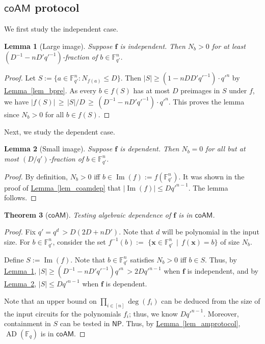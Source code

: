 \documentclass[11pt]{article}
\numberwithin{equation}{section}
\newtheorem{theorem}{Theorem}[section]
\newtheorem{lemma}[theorem]{Lemma}
\theoremstyle{definition}
\theoremstyle{plain}
\newcommand{\cclass}[1]{\textsf{#1}}
\newcommand{\expref}[2]{\hyperref[#2]{#1~\ref{#2}}}
\newcommand{\F}{\mathbb{F}}
\DeclareMathOperator{\im}{\mathrm{Im}}
\newcommand{\NP}{\cclass{NP}\xspace}  %
\newcommand{\coAM}{\cclass{coAM}\xspace}  %
\DeclareMathOperator{\AD}{\mathrm{AD}\xspace} %
\begin{document}
\subsection{\texorpdfstring{$\coAM$}{coAM} protocol}
We first study the independent case.
%

\begin{lemma}[Large image]\label{lem-coam-1}
Suppose $\mathbf f$
%
is  %
independent.
Then $N_b>0$ for at least $(D^{-1} - nD'q'^{-1})$-fraction of $b\in \F_{q'}^n$.
\end{lemma}
\begin{proof}
Let $S:= \{a\in \F_{q'}^n: N_{f(a)}\leq D\}$.
Then $|S|\geq (1-n DD'q'^{-1})\cdot q'^{n}$ by \expref{Lemma}{lem_bpre}.
As every $b\in f(S)$ has at most $D$ preimages in $S$ under $f$, we have 
$|f(S)| \,\ge\, |S|/D \,\ge\, (D^{-1}-nD'q'^{-1})\cdot q'^{n} $.
This proves the lemma since $N_b>0$ for all $b\in f(S)$.
\end{proof}

Next, we study the dependent case.

\begin{lemma}[Small image]\label{lem-coam-2}
Suppose $\mathbf f$
%
is  %
dependent.
Then $N_b=0$ for all but at most $(D/q')$-fraction of $b\in \F_{q'}^n$.
\end{lemma}
\begin{proof}
%
By definition, %
$N_b>0$ iff $b\in \im(f):=f(\F_{q'}^n)$. It was shown in the proof of \expref{Lemma}{lem_coamdep} that $|\im(f)| \le Dq'^{n-1}$. The lemma follows.
\end{proof}

\begin{theorem}[$\coAM$]\label{thm_coam}
Testing algebraic dependence of $\mathbf f$ is in $\coAM$.
\end{theorem}
\begin{proof}
Fix $q'=q^d \,> D(2D+nD')$. Note that $d$ will be polynomial in the input size.
For $b\in \F_{q'}^n$, consider the set 
$f^{-1}(b) :=$ $\{\mathbf x \in \F_{q'}^n \,\mid\, f(\mathbf x) = b \}$ of size $N_b$.

Define $S:= \im(f)$. Note that %
$b\in \F_{q'}^n$
%
satisfies   %
$N_b>0$ iff $b\in S$.
%
%
%
Thus, by \expref{Lemma}{lem-coam-1},
$|S|\ge (D^{-1} - nD'q'^{-1})q'^n\,> 2Dq'^{n-1}$ 
when $\mathbf f$ is independent, and
by \expref{Lemma}{lem-coam-2}, $|S|\le Dq'^{n-1}$
when $\mathbf f$ is dependent.

Note that an upper bound on $\prod_{i\in [n]}\deg(f_i)$ can be deduced from the size of the input circuits for 
%
the polynomials $f_i$; %
thus, we know $Dq'^{n-1}$. Moreover, containment in $S$ can be tested in $\NP$. Thus, by \expref{Lemma}{lem_amprotocol},
%
$\AD(\F_q)$    %
is in $\coAM$.
\end{proof}
\end{document}

